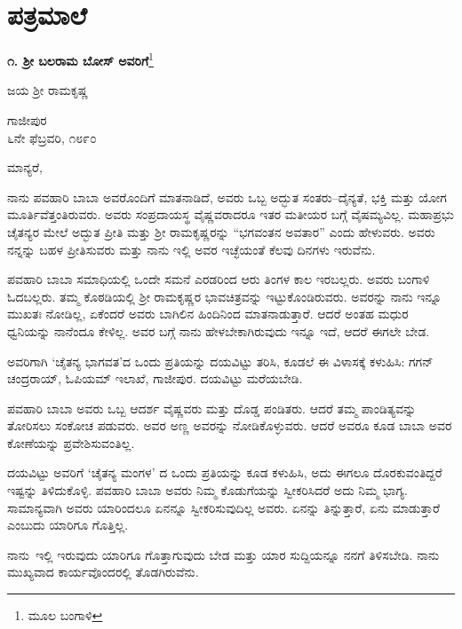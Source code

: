 \part{ಪತ್ರಮಾಲೆ}


\begin{center}
\textbf{೧. ಶ‍್ರೀ ಬಲರಾಮ ಬೋಸ್ ಅವರಿಗೆ}\footnote{ಮೂಲ ಬಂಗಾಳಿ}
\end{center}



\begin{center}
ಜಯ ಶ‍್ರೀ ರಾಮಕೃಷ್ಣ
\end{center}

\begin{flushright}
ಗಾಜೀಪುರ\\೬ನೇ ಫೆಬ್ರವರಿ, ೧೮೯೦
\end{flushright}

ಮಾನ್ಯರೆ,

ನಾನು ಪವಹಾರಿ ಬಾಬಾ ಅವರೊಂದಿಗೆ ಮಾತನಾಡಿದೆ, ಅವರು ಒಬ್ಬ ಅದ್ಭುತ ಸಂತರು–ದೈನ್ಯತೆ, ಭಕ್ತಿ ಮತ್ತು ಯೋಗ ಮೂರ್ತಿವೆತ್ತಂತಿರುವರು. ಅವರು ಸಂಪ್ರದಾಯಸ್ಥ ವೈಷ್ಣವರಾದರೂ ಇತರ ಮತೀಯರ ಬಗ್ಗೆ ವೈಷಮ್ಯವಿಲ್ಲ. ಮಹಾಪ್ರಭು ಚೈತನ್ಯರ ಮೇಲೆ ಅದ್ಭುತ ಪ್ರೀತಿ ಮತ್ತು ಶ‍್ರೀ ರಾಮಕೃಷ್ಣರನ್ನು “ಭಗವಂತನ ಅವತಾರ” ಎಂದು ಹೇಳುವರು. ಅವರು ನನ್ನನ್ನು ಬಹಳ ಪ್ರೀತಿಸುವರು ಮತ್ತು ನಾನು ಇಲ್ಲಿ ಅವರ ಇಚ್ಛೆಯಂತೆ ಕೆಲವು ದಿನಗಳು ಇರುವೆನು.

ಪವಹಾರಿ ಬಾಬಾ ಸಮಾಧಿಯಲ್ಲಿ ಒಂದೇ ಸಮನೆ ಎರಡರಿಂದ ಆರು ತಿಂಗಳ ಕಾಲ ಇರಬಲ್ಲರು. ಅವರು ಬಂಗಾಳಿ ಓದಬಲ್ಲರು. ತಮ್ಮ ಕೊಠಡಿಯಲ್ಲಿ ಶ‍್ರೀ ರಾಮಕೃಷ್ಣರ ಭಾವಚಿತ್ರವನ್ನು ಇಟ್ಟುಕೊಂಡಿರುವರು. ಅವರನ್ನು ನಾನು ಇನ್ನೂ ಮುಖತಃ ನೋಡಿಲ್ಲ, ಏಕೆಂದರೆ ಅವರು ಬಾಗಿಲಿನ ಹಿಂದಿನಿಂದ ಮಾತನಾಡುತ್ತಾರೆ. ಆದರೆ ಅಂತಹ ಮಧುರ ಧ್ವನಿಯನ್ನು ನಾನೆಂದೂ ಕೇಳಿಲ್ಲ. ಅವರ ಬಗ್ಗೆ ನಾನು ಹೇಳಬೇಕಾಗಿರುವುದು ಇನ್ನೂ ಇದೆ, ಆದರೆ ಈಗಲೇ ಬೇಡ.

ಅವರಿಗಾಗಿ ‘ಚೈತನ್ಯ ಭಾಗವತ’ದ ಒಂದು ಪ್ರತಿಯನ್ನು ದಯವಿಟ್ಟು ತರಿಸಿ, ಕೂಡಲೆ ಈ ವಿಳಾಸಕ್ಕೆ ಕಳುಹಿಸಿ: ಗಗನ್ ಚಂದ್ರರಾಯ್​, ಓಪಿಯಮ್​ ಇಲಾಖೆ, ಗಾಜೀಪುರ. ದಯವಿಟ್ಟು ಮರೆಯಬೇಡಿ.

ಪವಹಾರಿ ಬಾಬಾ ಅವರು ಒಬ್ಬ ಆದರ್ಶ ವೈಷ್ಣವರು ಮತ್ತು ದೊಡ್ಡ ಪಂಡಿತರು. ಆದರೆ ತಮ್ಮ ಪಾಂಡಿತ್ಯವನ್ನು ತೋರಿಸಲು ಸಂಕೋಚ ಪಡುವರು. ಅವರ ಅಣ್ಣ ಅವರನ್ನು ನೋಡಿಕೊಳ್ಳುವರು. ಆದರೆ ಅವರೂ ಕೂಡ ಬಾಬಾ ಅವರ ಕೋಣೆಯನ್ನು ಪ್ರವೇಶಿಸುವಂತಿಲ್ಲ.

ದಯವಿಟ್ಟು ಅವರಿಗೆ ‘ಚೈತನ್ಯ ಮಂಗಳ’ ದ ಒಂದು ಪ್ರತಿಯನ್ನು ಕೂಡ ಕಳುಹಿಸಿ, ಅದು ಈಗಲೂ ದೊರಕುವಂತಿದ್ದರೆ ಇಷ್ಟನ್ನು ತಿಳಿದುಕೊಳ್ಳಿ. ಪವಹಾರಿ ಬಾಬಾ ಅವರು ನಿಮ್ಮ ಕೊಡುಗೆಯನ್ನು ಸ್ವೀಕರಿಸಿದರೆ ಅದು ನಿಮ್ಮ ಭಾಗ್ಯ. ಸಾಮಾನ್ಯವಾಗಿ ಅವರು ಯಾರಿಂದಲೂ ಏನನ್ನೂ ಸ್ವೀಕರಿಸುವುದಿಲ್ಲ ಅವರು. ಏನನ್ನು ತಿನ್ನುತ್ತಾರೆ, ಏನು ಮಾಡುತ್ತಾರೆ ಎಂಬುದು ಯಾರಿಗೂ ಗೊತ್ತಿಲ್ಲ.

ನಾನು~ಇಲ್ಲಿ ಇರುವುದು ಯಾರಿಗೂ ಗೊತ್ತಾಗುವುದು ಬೇಡ ಮತ್ತು ಯಾರ ಸುದ್ದಿಯನ್ನೂ ನನಗೆ ತಿಳಿಸಬೇಡಿ. ನಾನು ಮುಖ್ಯವಾದ ಕಾರ್ಯವೊಂದರಲ್ಲಿ ತೊಡಗಿರುವೆನು.

